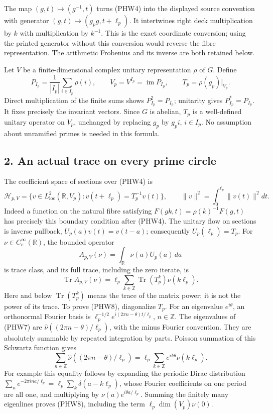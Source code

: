\documentclass[
  10pt,
  a4paper,
]{article}
\begin{document}
The map \((g,t)\mapsto(g^{-1},t)\) turns (PHW4) into the displayed
source convention with generator \((g,t)\mapsto(g_pg,t+\ell_p)\). It
intertwines right deck multiplication by \(k\) with multiplication by
\(k^{-1}\). This is the exact coordinate conversion; using the printed
generator without this conversion would reverse the fibre
representation. The arithmetic Frobenius and its inverse are both
retained below.

Let \(V\) be a finite-dimensional complex unitary representation
\(\rho\) of \(G\). Define \[
P_{I_p}=\frac1{|I_p|}\sum_{i\in I_p}\rho(i),
\qquad V_p=V^{I_p}=\operatorname{im}P_{I_p},
\qquad T_p=\rho(g_p)|_{V_p}.
\tag{PHW5}
\] Direct multiplication of the finite sums shows \(P_{I_p}^2=P_{I_p}\);
unitarity gives \(P_{I_p}^*=P_{I_p}\). It fixes precisely the invariant
vectors. Since \(G\) is abelian, \(T_p\) is a well-defined unitary
operator on \(V_p\), unchanged by replacing \(g_p\) by \(g_pi\),
\(i\in I_p\). No assumption about unramified primes is needed in this
formula.

\subsection{2. An actual trace on every prime
circle}\label{an-actual-trace-on-every-prime-circle}

The coefficient space of sections over (PHW4) is \[
\mathcal H_{p,V}=
\{v\in L^2_{\mathrm{loc}}(\mathbb R,V_p):
v(t+\ell_p)=T_p^{-1}v(t)\},
\qquad
\|v\|^2=\int_0^{\ell_p}\|v(t)\|^2dt.
\tag{PHW6}
\] Indeed a function on the natural fibre satisfying
\(F(gk,t)=\rho(k)^{-1}F(g,t)\) has precisely this boundary condition
after (PHW4). The unitary flow on sections is inverse pullback,
\(U_p(a)v(t)=v(t-a)\); consequently \(U_p(\ell_p)=T_p\). For
\(\nu\in C_c^\infty(\mathbb R)\), the bounded operator \[
A_{p,V}(\nu)=\int_{\mathbb R}\nu(a)U_p(a)\,da
\tag{PHW7}
\] is trace class, and its full trace, including the zero iterate, is \[
\boxed{
\operatorname{Tr}A_{p,V}(\nu)
=\ell_p\sum_{k\in\mathbb Z}\operatorname{Tr}(T_p^k)\nu(k\ell_p).
}
\tag{PHW8}
\] Here and below \(\operatorname{Tr}(T_p^k)\) means the trace of the
matrix power; it is not the power of its trace. To prove (PHW8),
diagonalize \(T_p\). For an eigenvalue \(e^{i\theta}\), an orthonormal
Fourier basis is \(\ell_p^{-1/2}e^{i(2\pi n-\theta)t/\ell_p}\),
\(n\in\mathbb Z\). The eigenvalues of (PHW7) are
\(\widehat\nu((2\pi n-\theta)/\ell_p)\), with the minus Fourier
convention. They are absolutely summable by repeated integration by
parts. Poisson summation of this Schwartz function gives \[
\sum_{n\in\mathbb Z}\widehat\nu((2\pi n-\theta)/\ell_p)
=\ell_p\sum_{k\in\mathbb Z}e^{ik\theta}\nu(k\ell_p).
\tag{PHW9}
\] For example this equality follows by expanding the periodic Dirac
distribution
\(\sum_n e^{-2\pi i n a/\ell_p}=\ell_p\sum_k\delta(a-k\ell_p)\), whose
Fourier coefficients on one period are all one, and multiplying by
\(\nu(a)e^{i\theta a/\ell_p}\). Summing the finitely many eigenlines
proves (PHW8), including the term \(\ell_p\dim(V_p)\nu(0)\).
\end{document}

